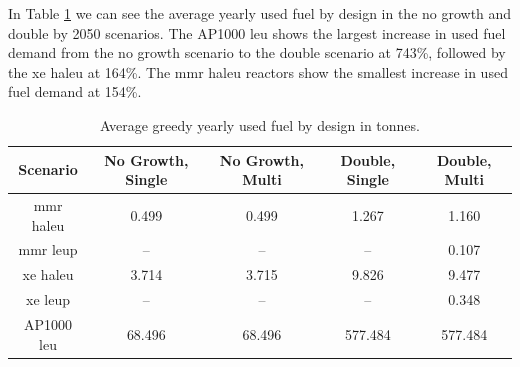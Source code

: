 In Table \ref{tab:greedy_used_avg} we can see the average yearly used fuel by design in the no growth and double by 2050 scenarios. The AP1000 \gls{leu} shows the largest increase in used fuel demand from the no growth scenario to the double scenario at 743\%, followed by the \gls{xe} \gls{haleu} at 164\%. The \gls{mmr} \gls{haleu} reactors show the smallest increase in used fuel demand at 154\%.


\begin{table}[H]
  \centering
  \caption{Average greedy yearly used fuel by design in tonnes.}
  \label{tab:greedy_used_avg}
  \begin{tabular}{c c c c c}
     \hline
     Scenario & No Growth, Single & No Growth, Multi & Double, Single & Double, Multi  \\
     \hline
     \gls{mmr} \gls{haleu}   & 0.499    & 0.499   & 1.267    & 1.160    \\
     \gls{mmr} \gls{leup}    & --       & --      & --       & 0.107    \\
     \gls{xe} \gls{haleu}    & 3.714    & 3.715   & 9.826    & 9.477    \\
     \gls{xe} \gls{leup}     & --       & --      & --       & 0.348    \\
     AP1000 \gls{leu}        & 68.496   & 68.496  & 577.484  & 577.484  \\
     \hline
  \end{tabular}
\end{table}


